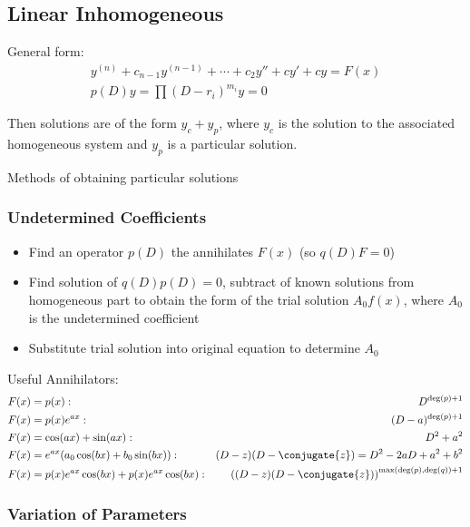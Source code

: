 \hypertarget{linear-inhomogeneous}{%
\subsection{Linear Inhomogeneous}\label{linear-inhomogeneous}}

General form:
\begin{align*}
y^{(n)} + c_{n-1} y^{(n-1)} + \cdots + c_2y'' + cy' + cy = F(x) \\
p(D)y = \prod (D-r_i)^{m_i} y= 0
\end{align*}

Then solutions are of the form \(y_c + y_p\), where \(y_c\) is the
solution to the associated homogeneous system and \(y_p\) is a
particular solution.

Methods of obtaining particular solutions

\hypertarget{undetermined-coefficients}{%
\subsubsection{Undetermined
Coefficients}\label{undetermined-coefficients}}

\begin{itemize}
\tightlist
\item
  Find an operator \(p(D)\) the annihilates \(F(x)\) (so \(q(D)F = 0\))
\item
  Find solution of \(q(D)p(D) = 0\), subtract of known solutions from
  homogeneous part to obtain the form of the trial solution \(A_0f(x)\),
  where \(A_0\) is the undetermined coefficient
\item
  Substitute trial solution into original equation to determine \(A_0\)
\end{itemize}

Useful Annihilators:
\begin{align*}
&F(x) = p(x): & D^{\deg(p)+1} \\
&F(x) = p(x)e^{ax}: & (D-a)^{\deg(p)+1}\\
&F(x) = \cos(ax) + \sin(ax): & D^2 + a^2\\
&F(x) = e^{ax}(a_0\cos(bx) + b_0\sin(bx)): & (D-z)(D-\conjugate{z}) = D^2 -2aD + a^2 + b^2 \\
&F(x) = p(x)e^{ax}\cos(bx) + p(x)e^{ax}\cos(bx): & \left( (D-z)(D-\conjugate{z})\right)^{\max(\deg(p), \deg(q))+ 1}
\end{align*}

\hypertarget{variation-of-parameters}{%
\subsubsection{Variation of Parameters}\label{variation-of-parameters}}

